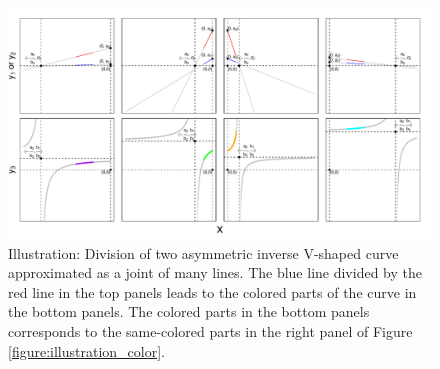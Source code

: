 \documentclass[11pt, a4paper]{article}
\begin{document}
\begin{figure}[H]
	\centering
	\hspace*{-2cm} 
	\includegraphics[width=1.4\columnwidth]{illustration_together.pdf}
	\caption{\small Illustration: Division of two asymmetric inverse V-shaped curve approximated as a joint of many lines. The blue line divided by the red line in the top panels leads to the colored parts of the curve in the bottom panels. The colored parts in the bottom panels corresponds to the same-colored parts in the right panel of Figure \ref{figure:illustration_color}.}
	\label{figure:illustration_hyperbola}
\end{figure}


\end{document}
